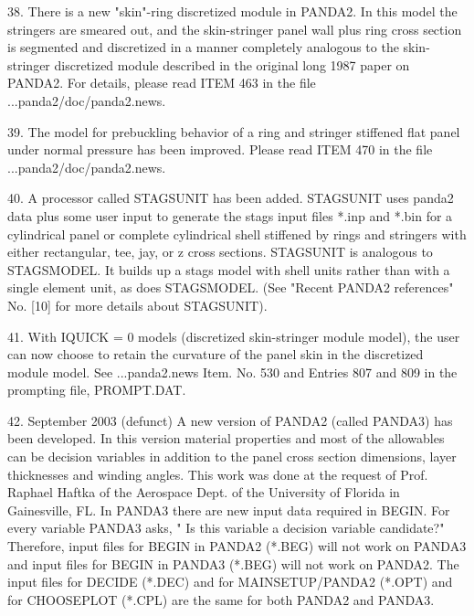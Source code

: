 38. There is a new "skin"-ring discretized module in PANDA2. In this model
the stringers are smeared out, and the skin-stringer panel wall plus ring
cross section is segmented and discretized in a manner completely
analogous to the skin-stringer discretized module described in the
original long 1987 paper on PANDA2. For details, please read ITEM 463 in
the file ...panda2/doc/panda2.news. 

39. The model for prebuckling behavior of a ring and stringer stiffened
flat panel under normal pressure has been improved. Please read ITEM 470
in the file ...panda2/doc/panda2.news.

40. A processor called STAGSUNIT has been added. STAGSUNIT uses panda2
data plus some user input to generate the stags input files *.inp and
*.bin for a cylindrical panel or complete cylindrical shell stiffened by
rings and stringers with either rectangular, tee, jay, or z cross
sections. STAGSUNIT is analogous to STAGSMODEL. It builds up a stags model
with shell units rather than with a single element unit, as does
STAGSMODEL. (See "Recent PANDA2 references" No. [10] for more details about
STAGSUNIT).

41. With IQUICK = 0 models (discretized skin-stringer module model), the
user can now choose to retain the curvature of the panel skin in the
discretized module model. See ...panda2.news Item. No. 530 and Entries
807 and 809 in the prompting file, PROMPT.DAT.


42. September 2003 (defunct)
A new version of PANDA2 (called PANDA3) has been developed. In this version material
properties and most of the allowables can be decision variables in addition to the
panel cross section dimensions, layer thicknesses and winding angles. This work was
done at the request of Prof. Raphael Haftka of the Aerospace Dept. of the University
of Florida in Gainesville, FL.
In PANDA3 there are new input data required in BEGIN. For every variable PANDA3 asks, 
" Is this variable a decision variable candidate?" Therefore, input files for BEGIN
in PANDA2 (*.BEG) will not work on PANDA3 and input files for BEGIN in PANDA3 (*.BEG)
will not work on PANDA2.
The input files for DECIDE (*.DEC) and for MAINSETUP/PANDA2 (*.OPT) and for
CHOOSEPLOT (*.CPL) are the same for both PANDA2 and PANDA3.

